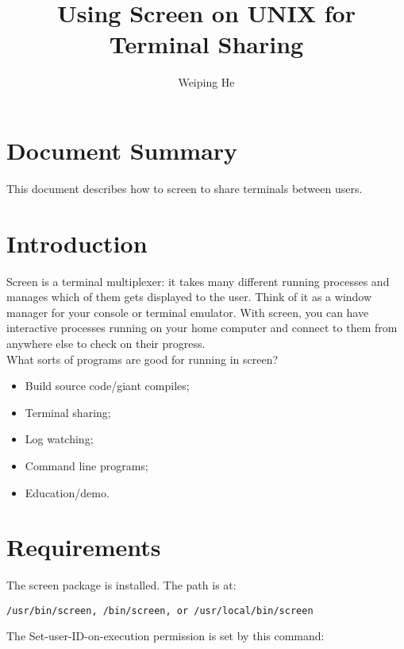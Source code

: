\documentclass[11pt]{article}
\begin{document}


\title{Using Screen on UNIX for Terminal Sharing}
\author{
Weiping He
}
\date{}

\maketitle

\section{Document Summary}
This document describes how to screen to share terminals between users.


\section{Introduction}
Screen is a terminal multiplexer: it takes many different running processes and manages which of them gets displayed to the user. Think of it as a window manager for your console or terminal emulator. With screen, you can have interactive processes running on your home computer and connect to them from anywhere else to check on their progress.\\
%
What sorts of programs are good for running in screen?

\begin{itemize}
	\item Build source code/giant compiles;
	\item Terminal sharing;
	\item Log watching;	
	\item Command line programs;
	\item Education/demo.
\end{itemize}

\section{Requirements}
The screen package is installed. The path is at:

\begin{verbatim}/usr/bin/screen, /bin/screen, or /usr/local/bin/screen\end{verbatim}
The Set-user-ID-on-execution permission is set by this command:
\end{document}
